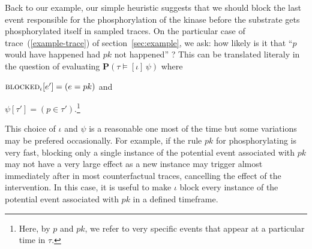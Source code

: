 Back to our example, our simple heuristic suggests that we should
block the last event responsible for the phosphorylation of the kinase
before the substrate gets phosphorylated itself in sampled traces. On
the particular case of trace~(\ref{example-trace}) of
section~\ref{sec:example}, we ask: how likely is it that ``$p$ would
have happened had $pk$ not happened'' ?  This can be translated
literaly in the question of evaluating
$\mathbf{P}(\tau \models [\iota] \, \psi)$ where
\begin{inparaenum}[(i)]
\item ${\textsc{blocked}}_{\iota}[e'] = (e = pk)$ and
\item $\psi[\tau'] = (p \in \tau')$.\footnote{Here, by $p$ and $pk$,
    we refer to very specific events that appear at a particular time
    in $\tau$.}
\end{inparaenum}
This choice of $\iota$ and $\psi$ is a reasonable one most of the
time but some variations may be prefered occasionally. For example, if
the rule $pk$ for phosphorylating is very fast, blocking only a single
instance of the potential event associated with $pk$ may not have a
very large effect as a new instance may trigger almost immediately
after in most counterfactual traces, cancelling the effect of the
intervention.  In this case, it is useful to make $\iota$ block every
instance of the potential event associated with $pk$ in a defined
timeframe.
